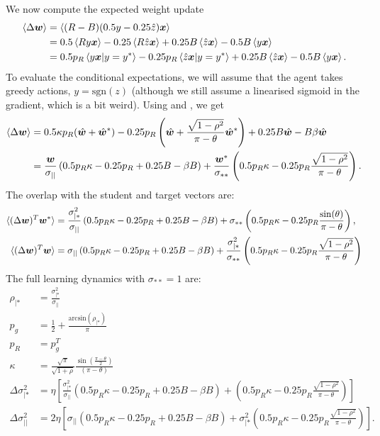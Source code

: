 \documentclass{article}
\renewcommand\b\bm
\begin{document}
We now compute the expected weight update
\begin{align}
    \braket{\Delta \b{w}} &= \braket{(R - B) (0.5 y - 0.25 \hat{z}) \b{x}}\\
    &= 0.5 \braket{R y \b{x}} - 0.25 \braket{R \hat{z} \b{x}} + 0.25 B \braket{\hat{z} \b{x}} - 0.5 B \braket{y \b{x}}\\
    &= 0.5 p_R \braket{y \b{x} | y = y^*} - 0.25 p_R \braket{ \hat{z} \b{x} | y = y^*} + 0.25 B \braket{\hat{z} \b{x}} - 0.5 B \braket{y \b{x}}.
\end{align}
To evaluate the conditional expectations, we will assume that the agent takes greedy actions, $y = \text{sgn}(z)$ (although we still assume a linearised sigmoid in the gradient, which is a bit weird).
Using  and , we get
\begin{align}
    \braket{\Delta \b{w}} &= 0.5 \kappa p_R (\hat{\b{w}} + \hat{\b{w}}^*) - 0.25 p_R \left (\hat{\b{w}} + \frac{\sqrt{1-\rho^2} }{\pi - \theta} \hat{\b{w}}^* \right ) + 0.25 B \hat{\b{w}} - B \beta \hat{\b{w}}\\
    &= \frac{\b{w}}{\sigma_{||}} \left ( 0.5 p_R \kappa - 0.25 p_R  + 0.25 B - \beta B \right ) + \frac{\b{w}^*}{\sigma_{**}} \left ( 0.5 p_R \kappa - 0.25 p_R \frac{\sqrt{1-\rho^2} }{\pi - \theta} \right ).
\end{align}
The overlap with the student and target vectors are:
\begin{align}
    \braket{ (\Delta \b{w})^T \b{w}^*} &= \frac{\sigma_{|*}^2}{\sigma_{||}} \left ( 0.5 p_R \kappa - 0.25 p_R  + 0.25 B - \beta B \right ) + \sigma_{**} \left ( 0.5 p_R \kappa - 0.25 p_R \frac{\sin (\theta) }{\pi - \theta}  \right ),\\
    \braket{ (\Delta \b{w})^T \b{w}} &= \sigma_{||} \left ( 0.5 p_R \kappa - 0.25 p_R  + 0.25 B - \beta B \right ) + \frac{\sigma_{|*}^2}{\sigma_{**}} \left ( 0.5 p_R \kappa - 0.25 p_R \frac{\sqrt{1-\rho^2} }{\pi - \theta} \right )
\end{align}
The full learning dynamics with $\sigma_{**} = 1$ are:
\begin{align}
    \rho_{|*} &= \frac{\sigma_{|*}^2}{\sigma_{||}}\\
    p_g &= \frac{1}{2} + \frac{\text{arcsin}(\rho_{|*})}{\pi}\\
    p_R &= p_g^T \\
    \kappa &= \frac{ \sqrt{\pi} }{ \sqrt{ 1 + \rho} } \frac{\sin (\frac{\pi - \theta}{2}) }{ (\pi - \theta) }\\
    \Delta \sigma_{|*}^2 &= \eta \left [ \frac{\sigma_{|*}^2}{\sigma_{||}} \left ( 0.5 p_R \kappa - 0.25 p_R  + 0.25 B - \beta B \right ) + \left ( 0.5 p_R \kappa - 0.25 p_R \frac{\sqrt{1-\rho^2} }{\pi - \theta}  \right ) \right ] \\
    \Delta \sigma_{||}^2 &= 2 \eta \left [ \sigma_{||} \left ( 0.5 p_R \kappa - 0.25 p_R  + 0.25 B - \beta B \right ) + \sigma_{|*}^2 \left ( 0.5 p_R \kappa - 0.25 p_R \frac{ \sqrt{1-\rho^2} }{\pi - \theta} \right ) \right ].
\end{align}
\end{document}
